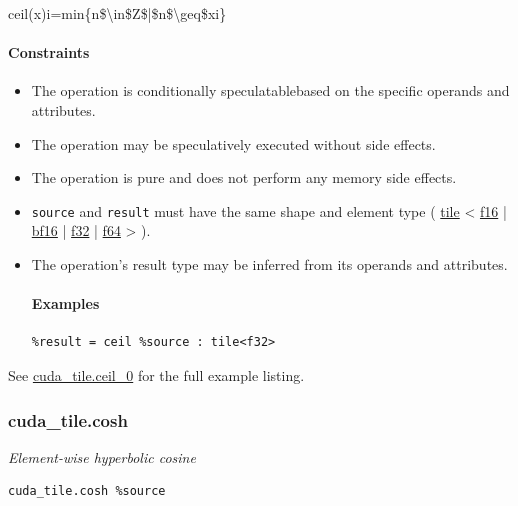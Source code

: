 \documentclass{article}
\begin{document}
ceil(x)i=min\{n\$\textbackslash{}in\$Z\$|\$n\$\textbackslash{}geq\$xi\}


\paragraph{Constraints}

\begin{itemize}
\item The operation is conditionally speculatablebased on the specific operands and attributes.
\item The operation may be speculatively executed without side effects.
\item The operation is pure and does not perform any memory side effects.
\item \texttt{source} and \texttt{result} must have the same shape and element type ( \href{https://docs.nvidia.com/cuda/tile-ir/latest/sections/types.html#type-tile}{tile} < \href{https://docs.nvidia.com/cuda/tile-ir/latest/sections/types.html#subsection-element-types}{f16} | \href{https://docs.nvidia.com/cuda/tile-ir/latest/sections/types.html#subsection-element-types}{bf16} | \href{https://docs.nvidia.com/cuda/tile-ir/latest/sections/types.html#subsection-element-types}{f32} | \href{https://docs.nvidia.com/cuda/tile-ir/latest/sections/types.html#subsection-element-types}{f64} > ).
\item The operation's result type may be inferred from its operands and attributes.


\paragraph{Examples}

\begin{lstlisting}
%result = ceil %source : tile<f32>
\end{lstlisting}

\end{itemize}
See \href{https://docs.nvidia.com/cuda/tile-ir/latest/sections/appendix.html#example-cuda-tile-ceil-0}{cuda\_tile.ceil\_0} for the full example listing.



\subsubsection{cuda\_tile.cosh}

\textit{Element-wise hyperbolic cosine}


\begin{lstlisting}
cuda_tile.cosh %source
\end{lstlisting}
\end{document}
